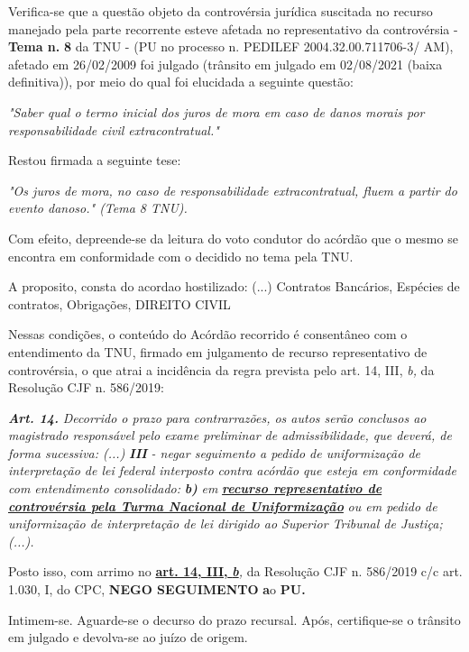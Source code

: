 \documentclass[12pt]{article}
\begin{document}
\justifying
\noindent Verifica-se que a questão objeto da controvérsia jurídica suscitada no recurso manejado pela parte recorrente esteve afetada no representativo da controvérsia - \textbf{Tema n. }\textbf{8} da TNU - (PU no processo n. PEDILEF 2004.32.00.711706-3/ AM),  afetado em 26/02/2009 foi julgado (trânsito em julgado em 02/08/2021 (baixa definitiva)), por meio do qual foi elucidada a seguinte questão:

\noindent \textit{"Saber qual o termo inicial dos juros de mora em caso de danos morais por responsabilidade civil extracontratual."}

\noindent Restou firmada a seguinte tese:

\noindent \textit{"Os juros de mora, no caso de responsabilidade extracontratual, fluem a partir do evento danoso." (Tema 8 TNU).}

\noindent Com efeito, depreende-se da leitura do voto condutor do acórdão que o mesmo se encontra em conformidade com o decidido no  tema pela TNU.

\noindent A proposito, consta do acordao hostilizado: (...) Contratos Bancários, Espécies de contratos, Obrigações, DIREITO CIVIL

\noindent Nessas condições, o conteúdo do Acórdão recorrido é consentâneo com o entendimento da TNU, firmado em julgamento de recurso representativo de controvérsia, o que atrai a incidência da regra prevista pelo art. 14, III, \textit{b,} da Resolução CJF n. 586/2019:

\noindent \textit{\textbf{Art. 14.}}\textit{ Decorrido o prazo para contrarrazões, os autos serão conclusos ao magistrado responsável pelo exame preliminar de admissibilidade, que deverá, de forma sucessiva: (...) }\textit{\textbf{III }}\textit{- negar seguimento a pedido de uniformização de interpretação de lei federal interposto contra acórdão que esteja em conformidade com entendimento consolidado: }\textit{\textbf{b)}}\textit{ em }\uline{\textit{\textbf{recurso representativo de controvérsia pela Turma Nacional de Uniformização}}}\textit{ ou em pedido de uniformização de interpretação de lei dirigido ao Superior Tribunal de Justiça;(...).}

\noindent Posto isso, com arrimo no \uline{\textbf{art. 14, III, }}\uline{\textit{\textbf{b}}}\textit{,} da Resolução CJF n. 586/2019 c/c art. 1.030, I, do CPC, \textbf{NEGO SEGUIMENTO }\textbf{a}o\textbf{ PU}\textbf{.}

\noindent Intimem-se. Aguarde-se o decurso do prazo recursal. Após, certifique-se o trânsito em julgado e devolva-se ao juízo de origem.
\end{document}
